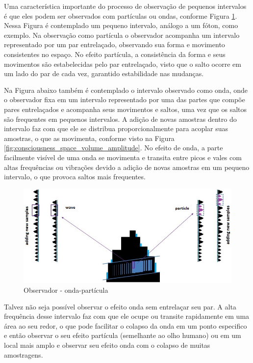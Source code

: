 Uma característica importante do processo de observação de pequenos intervalos é que eles podem ser observados com partículas ou ondas, conforme Figura \ref{fig:consciousness_space_wave-particle}. Nessa Figura é contemplado um pequeno intervalo, análogo a um fóton, como exemplo. Na observação como partícula o observador acompanha um intervalo representado por um par entrelaçado, observando sua forma e movimento consistentes no espaço. No efeito partícula, a consistência da forma e seus movimentos são estabelecidas pelo par entrelaçado, visto que o salto ocorre em um lado do par de cada vez, garantido estabilidade nas mudanças.

Na Figura abaixo também é contemplado o intervalo observado como onda, onde o observador fixa em um intervalo representado por uma das partes que compõe pares entrelaçados e acompanha seus movimentos e saltos, uma vez que os saltos são frequentes em pequenos intervalos. A adição de novas amostras dentro do intervalo faz com que ele se distribua proporcionalmente para acoplar suas amostras, o que as movimenta, conforme visto na Figura \ref{fig:consciousness_space_volume_amplitude}. No efeito de onda, a parte facilmente visível de uma onda se movimenta e transita entre picos e vales com altas frequências ou vibrações devido a adição de novas amostras em um pequeno intervalo, o que provoca saltos mais frequentes.
	\begin{figure}[H]
	\caption{Observador - onda-partícula}
	\label{fig:consciousness_space_wave-particle}
	\centering
	\includegraphics[scale=.55]{sections/images/consciousness_space_wave-particle.jpg}
	\end{figure}

Talvez não seja possível observar o efeito onda sem entrelaçar seu par. A alta frequência desse intervalo faz com que ele ocupe ou transite rapidamente em uma área ao seu redor, o que pode facilitar o colapso da onda em um ponto especifico e então observar o seu efeito partícula (semelhante ao olho humano) ou em um local mais amplo e observar seu efeito onda com o colapso de muitas amostragens.
